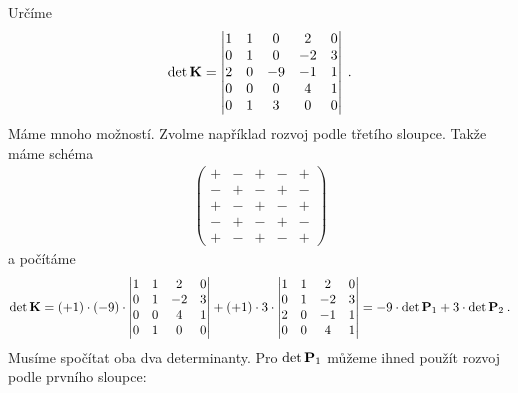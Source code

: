 \begin{itemize}
    \begin{example}
        Určíme \begin{align}
            \det \mathbf{K} = \left|\begin{matrix}
                1 & 1 & 0 & 2 & 0 \\
                0 & 1 & 0 & -2 & 3 \\
                2 & 0 & -9 & -1 & 1 \\
                0 & 0 & 0 & 4 & 1 \\
                0 & 1 & 3 & 0 & 0
                \end{matrix}\right| \:.
        \end{align}
        Máme mnoho možností. Zvolme například rozvoj podle třetího sloupce. Takže máme schéma \begin{align}
            \begin{pmatrix}
            + & - & \boldsymbol{+} & - & + \\
            - & + & \boldsymbol{-} & + & - \\
            + & - & \boldsymbol{+} & - & + \\
            - & + & \boldsymbol{-} & + & - \\
            + & - & \boldsymbol{+} & - & +
            \end{pmatrix}
        \end{align}
        a počítáme
        \begin{align}
            \det \mathbf{K} = (+1) \cdot (-9) \cdot
            \begin{vmatrix}
                1 & 1 & 2 & 0 \\
                0 & 1 & -2 & 3 \\
                0 & 0 & 4 & 1 \\
                0 & 1 & 0 & 0
            \end{vmatrix}
            + (+1) \cdot 3 \cdot
            \begin{vmatrix}
                1 & 1  & 2 & 0 \\
                0 & 1  & -2 & 3 \\
                2 & 0  & -1 & 1 \\
                0 & 0  & 4 & 1
            \end{vmatrix}
            = -9 \cdot \det \mathbf{P}_1 + 3 \cdot \det \mathbf{P}_2 \:.
        \end{align}
        Musíme spočítat oba dva determinanty. Pro $\det \mathbf{P}_1$ můžeme ihned použít rozvoj podle prvního sloupce:

\end{example}
\end{itemize}
